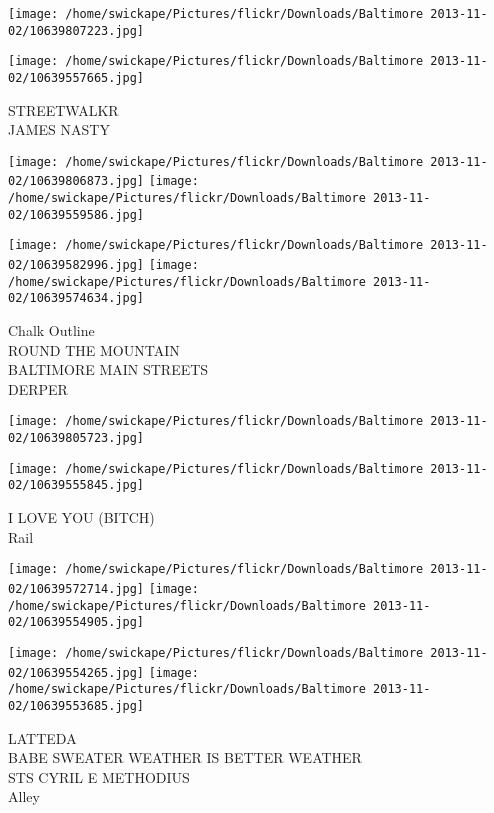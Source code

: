 \documentclass[10pt,letterpaper]{article}
\begin{document}
\texttt{[image: /home/swickape/Pictures/flickr/Downloads/Baltimore 2013-11-02/10639807223.jpg]}

\vspace{0.25in}
\texttt{[image: /home/swickape/Pictures/flickr/Downloads/Baltimore 2013-11-02/10639557665.jpg]}

STREETWALKR\\
JAMES NASTY\\
\pagebreak

\texttt{[image: /home/swickape/Pictures/flickr/Downloads/Baltimore 2013-11-02/10639806873.jpg]}
\texttt{[image: /home/swickape/Pictures/flickr/Downloads/Baltimore 2013-11-02/10639559586.jpg]}

\texttt{[image: /home/swickape/Pictures/flickr/Downloads/Baltimore 2013-11-02/10639582996.jpg]}
\texttt{[image: /home/swickape/Pictures/flickr/Downloads/Baltimore 2013-11-02/10639574634.jpg]}

Chalk Outline\\
ROUND THE MOUNTAIN\\
BALTIMORE MAIN STREETS\\
DERPER\\
\pagebreak

\texttt{[image: /home/swickape/Pictures/flickr/Downloads/Baltimore 2013-11-02/10639805723.jpg]}

\vspace{0.25in}
\texttt{[image: /home/swickape/Pictures/flickr/Downloads/Baltimore 2013-11-02/10639555845.jpg]}

I LOVE YOU (BITCH)\\
Rail\\
\pagebreak

\texttt{[image: /home/swickape/Pictures/flickr/Downloads/Baltimore 2013-11-02/10639572714.jpg]}
\texttt{[image: /home/swickape/Pictures/flickr/Downloads/Baltimore 2013-11-02/10639554905.jpg]}

\texttt{[image: /home/swickape/Pictures/flickr/Downloads/Baltimore 2013-11-02/10639554265.jpg]}
\texttt{[image: /home/swickape/Pictures/flickr/Downloads/Baltimore 2013-11-02/10639553685.jpg]}

LATTEDA\\
BABE SWEATER WEATHER IS BETTER WEATHER\\
STS CYRIL E METHODIUS\\
Alley\\
\pagebreak
\end{document}
